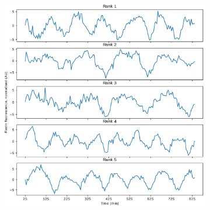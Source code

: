 \begin{figure}[p]
  \centering
  \begin{subfigure}[t]{0.65\textwidth}
  \centering
    \includegraphics[width=\linewidth]{glynn_is20016_1_edit.pdf}
    \caption{
    }
    \label{fig:glynn-best-ts}
  \end{subfigure}%
  \begin{subfigure}[t]{0.35\textwidth}
  \centering

\end{subfigure}
\end{figure}
